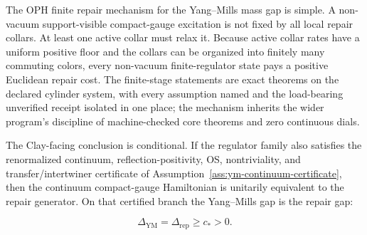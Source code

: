 \documentclass[11pt]{article}
\numberwithin{equation}{section}
\theoremstyle{remark}
\newcommand{\YM}{\mathrm{YM}}
\begin{document}
The OPH finite repair mechanism for the Yang--Mills mass gap is simple. A non-vacuum
support-visible compact-gauge excitation is not fixed by all local repair collars. At least one
active collar must relax it. Because active collar rates have a uniform positive floor and the
collars can be organized into finitely many commuting colors, every non-vacuum finite-regulator
state pays a positive Euclidean repair cost. The finite-stage statements are exact theorems on the
declared cylinder system, with every assumption named and the load-bearing unverified receipt
isolated in one place; the mechanism inherits the wider program's discipline of machine-checked
core theorems and zero continuous dials.

The Clay-facing conclusion is conditional. If the regulator family also satisfies the
renormalized continuum, reflection-positivity, OS, nontriviality, and transfer/intertwiner
certificate of Assumption~\ref{ass:ym-continuum-certificate}, then the continuum compact-gauge
Hamiltonian is unitarily equivalent to the repair generator. On that certified branch the
Yang--Mills gap is the repair gap:

\[
\boxed{
\Delta_{\YM}=\Delta_{\mathrm{rep}}\ge c_*>0.
}
\]
\end{document}
